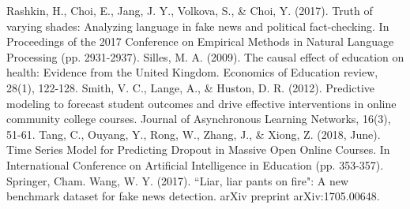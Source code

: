 \documentclass[12pt, final]{article}
\begin{document}
\begin{thebibliography}{1}
     Rashkin, H., Choi, E., Jang, J. Y., Volkova, S., \& Choi, Y. (2017). Truth of varying shades: Analyzing language in fake news and political fact-checking. In Proceedings of the 2017 Conference on Empirical Methods in Natural Language Processing (pp. 2931-2937).
     Silles, M. A. (2009). The causal effect of education on health: Evidence from the United Kingdom. Economics of Education review, 28(1), 122-128.
     Smith, V. C., Lange, A., \& Huston, D. R. (2012). Predictive modeling to forecast student outcomes and drive effective interventions in online community college courses. Journal of Asynchronous Learning Networks, 16(3), 51-61.
     Tang, C., Ouyang, Y., Rong, W., Zhang, J., \& Xiong, Z. (2018, June). Time Series Model for Predicting Dropout in Massive Open Online Courses. In International Conference on Artificial Intelligence in Education (pp. 353-357). Springer, Cham.
     Wang, W. Y. (2017). ``Liar, liar pants on fire": A new benchmark dataset for fake news detection. arXiv preprint arXiv:1705.00648.
  \end{thebibliography}
\end{document}
